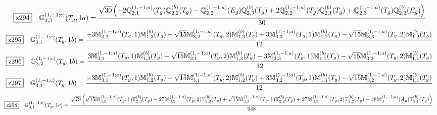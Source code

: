 \documentclass[fleqn,10pt,landscape]{jsarticle}
\begin{document}
\begin{dmath*}
\hspace*{3mm}\fbox{z294}\quad \mathbb{G}_{3,3}^{(1,-1;c)}(T_{g},1a)=\frac{\sqrt{30} \left(- 2 \mathbb{Q}_{2,1}^{(1,-1;a)}(T_{g}) \mathbb{Q}_{2,2}^{(b)}(T_{g}) - \mathbb{Q}_{2,2}^{(1,-1;a)}(E_{g}) \mathbb{Q}_{2,3}^{(b)}(T_{g}) + 2 \mathbb{Q}_{2,2}^{(1,-1;a)}(T_{g}) \mathbb{Q}_{2,1}^{(b)}(T_{g}) + \mathbb{Q}_{2,3}^{(1,-1;a)}(T_{g}) \mathbb{Q}_{2,2}^{(b)}(E_{g})\right)}{30}
\end{dmath*}
\begin{dmath*}
\hspace*{3mm}\fbox{z295}\quad \mathbb{G}_{3,1}^{(1,-1;c)}(T_{g},1b)=\frac{- 3 \mathbb{M}_{3,2}^{(1,-1;a)}(T_{g},1) \mathbb{M}_{1,3}^{(b)}(T_{g}) - \sqrt{15} \mathbb{M}_{3,2}^{(1,-1;a)}(T_{g},2) \mathbb{M}_{1,3}^{(b)}(T_{g}) + 3 \mathbb{M}_{3,3}^{(1,-1;a)}(T_{g},1) \mathbb{M}_{1,2}^{(b)}(T_{g}) - \sqrt{15} \mathbb{M}_{3,3}^{(1,-1;a)}(T_{g},2) \mathbb{M}_{1,2}^{(b)}(T_{g})}{12}
\end{dmath*}
\begin{dmath*}
\hspace*{3mm}\fbox{z296}\quad \mathbb{G}_{3,2}^{(1,-1;c)}(T_{g},1b)=\frac{3 \mathbb{M}_{3,1}^{(1,-1;a)}(T_{g},1) \mathbb{M}_{1,3}^{(b)}(T_{g}) - \sqrt{15} \mathbb{M}_{3,1}^{(1,-1;a)}(T_{g},2) \mathbb{M}_{1,3}^{(b)}(T_{g}) - 3 \mathbb{M}_{3,3}^{(1,-1;a)}(T_{g},1) \mathbb{M}_{1,1}^{(b)}(T_{g}) - \sqrt{15} \mathbb{M}_{3,3}^{(1,-1;a)}(T_{g},2) \mathbb{M}_{1,1}^{(b)}(T_{g})}{12}
\end{dmath*}
\begin{dmath*}
\hspace*{3mm}\fbox{z297}\quad \mathbb{G}_{3,3}^{(1,-1;c)}(T_{g},1b)=\frac{- 3 \mathbb{M}_{3,1}^{(1,-1;a)}(T_{g},1) \mathbb{M}_{1,2}^{(b)}(T_{g}) - \sqrt{15} \mathbb{M}_{3,1}^{(1,-1;a)}(T_{g},2) \mathbb{M}_{1,2}^{(b)}(T_{g}) + 3 \mathbb{M}_{3,2}^{(1,-1;a)}(T_{g},1) \mathbb{M}_{1,1}^{(b)}(T_{g}) - \sqrt{15} \mathbb{M}_{3,2}^{(1,-1;a)}(T_{g},2) \mathbb{M}_{1,1}^{(b)}(T_{g})}{12}
\end{dmath*}
\begin{dmath*}
\hspace*{3mm}\fbox{z298}\quad \mathbb{G}_{3,1}^{(1,-1;c)}(T_{g},1c)=\frac{\sqrt{79} \left(\sqrt{15} \mathbb{M}_{3,2}^{(1,-1;a)}(T_{g},1) \mathbb{T}_{2,3}^{(b)}(T_{g}) - 27 \mathbb{M}_{3,2}^{(1,-1;a)}(T_{g},2) \mathbb{T}_{2,3}^{(b)}(T_{g}) + \sqrt{15} \mathbb{M}_{3,3}^{(1,-1;a)}(T_{g},1) \mathbb{T}_{2,2}^{(b)}(T_{g}) + 27 \mathbb{M}_{3,3}^{(1,-1;a)}(T_{g},2) \mathbb{T}_{2,2}^{(b)}(T_{g}) - 48 \mathbb{M}_{3}^{(1,-1;a)}(A_{g}) \mathbb{T}_{2,1}^{(b)}(T_{g})\right)}{948}
\end{dmath*}
\end{document}
